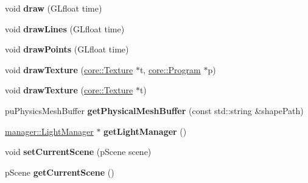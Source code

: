 \begin{DoxyCompactItemize}
\item 
\hypertarget{classfillwave_1_1Engine_ae6b333344d6322eb369f6d53fe24d292}{}void {\bfseries draw} (G\+Lfloat time)\label{classfillwave_1_1Engine_ae6b333344d6322eb369f6d53fe24d292}

\item 
\hypertarget{classfillwave_1_1Engine_af9320dfea90a32c439e67ddb08262b15}{}void {\bfseries draw\+Lines} (G\+Lfloat time)\label{classfillwave_1_1Engine_af9320dfea90a32c439e67ddb08262b15}

\item 
\hypertarget{classfillwave_1_1Engine_a29d9953bd25b6cd33b9bf1f0ea5df431}{}void {\bfseries draw\+Points} (G\+Lfloat time)\label{classfillwave_1_1Engine_a29d9953bd25b6cd33b9bf1f0ea5df431}

\item 
\hypertarget{classfillwave_1_1Engine_a459fceda9f89ab99df831fb3dcef6f55}{}void {\bfseries draw\+Texture} (\hyperlink{classfillwave_1_1core_1_1Texture}{core\+::\+Texture} $\ast$t, \hyperlink{classfillwave_1_1core_1_1Program}{core\+::\+Program} $\ast$p)\label{classfillwave_1_1Engine_a459fceda9f89ab99df831fb3dcef6f55}

\item 
\hypertarget{classfillwave_1_1Engine_a5755d2d20fd2a24c95282adc6263cbbe}{}void {\bfseries draw\+Texture} (\hyperlink{classfillwave_1_1core_1_1Texture}{core\+::\+Texture} $\ast$t)\label{classfillwave_1_1Engine_a5755d2d20fd2a24c95282adc6263cbbe}

\item 
\hypertarget{classfillwave_1_1Engine_a16884ac1bd9a55ee11cb915bc7ac1bad}{}pu\+Physics\+Mesh\+Buffer {\bfseries get\+Physical\+Mesh\+Buffer} (const std\+::string \&shape\+Path)\label{classfillwave_1_1Engine_a16884ac1bd9a55ee11cb915bc7ac1bad}

\item 
\hypertarget{classfillwave_1_1Engine_a1e1c27b9f9ba2dd7b8607be61ca12a45}{}\hyperlink{classfillwave_1_1manager_1_1LightManager}{manager\+::\+Light\+Manager} $\ast$ {\bfseries get\+Light\+Manager} ()\label{classfillwave_1_1Engine_a1e1c27b9f9ba2dd7b8607be61ca12a45}

\item 
\hypertarget{classfillwave_1_1Engine_aa7001ee49ec51a6a47fdd3b9fa0619df}{}void {\bfseries set\+Current\+Scene} (p\+Scene scene)\label{classfillwave_1_1Engine_aa7001ee49ec51a6a47fdd3b9fa0619df}

\item 
\hypertarget{classfillwave_1_1Engine_aa5c793f2bcee964fe0f9ad1aa1857189}{}p\+Scene {\bfseries get\+Current\+Scene} ()\label{classfillwave_1_1Engine_aa5c793f2bcee964fe0f9ad1aa1857189}


\end{DoxyCompactItemize}
